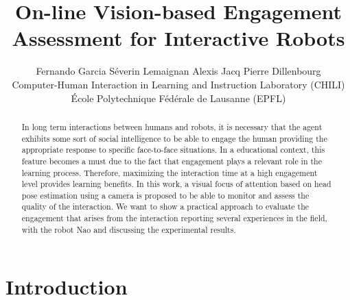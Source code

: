 \documentclass{sig-alternate}
\begin{document}
%

\title{On-line Vision-based Engagement Assessment for Interactive Robots}
\author{Fernando Garcia \qquad Séverin Lemaignan \qquad Alexis Jacq \qquad Pierre Dillenbourg\\Computer-Human Interaction in Learning and Instruction Laboratory (CHILI)\\École Polytechnique Fédérale de Lausanne (EPFL)}


\maketitle
\begin{abstract}
In long term interactions between humans and robots, it is necessary that the agent exhibits some sort of social intelligence to be able to engage the human providing the appropriate response to specific face-to-face situations. In a educational context, this feature becomes a must due to the fact that engagement plays a relevant role in the learning process. Therefore, maximizing the interaction time at a high engagement level provides learning benefits. In this work, a visual focus of attention based on head pose estimation using a camera is proposed to be able to monitor and assess the quality of the interaction. We want to show a practical approach to evaluate the engagement that arises from the interaction reporting several experiences in the field, with the robot Nao and discussing the experimental results.
\end{abstract}




\section{Introduction}
\end{document}
